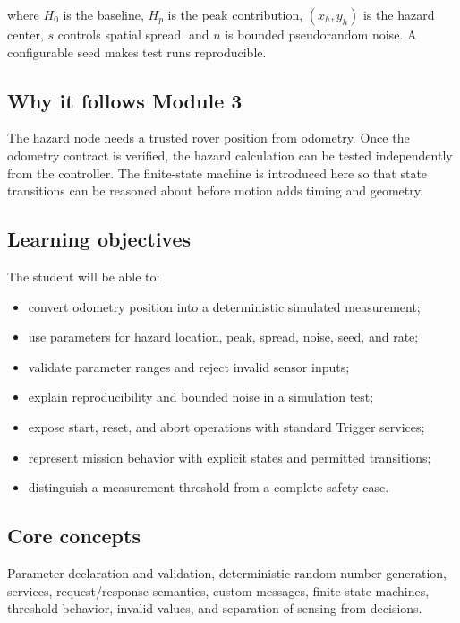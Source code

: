 \documentclass[11pt]{article}
\begin{document}
where $H_{0}$ is the baseline, $H_{p}$ is the peak contribution,
$(x_{h},y_{h})$ is the hazard center, $s$ controls spatial spread, and $n$ is
bounded pseudorandom noise. A configurable seed makes test runs reproducible.

\subsection{Why it follows Module 3}

The hazard node needs a trusted rover position from odometry. Once the odometry
contract is verified, the hazard calculation can be tested independently from
the controller. The finite-state machine is introduced here so that state
transitions can be reasoned about before motion adds timing and geometry.

\subsection{Learning objectives}

The student will be able to:

\begin{itemize}
  \item convert odometry position into a deterministic simulated measurement;
  \item use parameters for hazard location, peak, spread, noise, seed, and rate;
  \item validate parameter ranges and reject invalid sensor inputs;
  \item explain reproducibility and bounded noise in a simulation test;
  \item expose start, reset, and abort operations with standard Trigger services;
  \item represent mission behavior with explicit states and permitted
        transitions;
  \item distinguish a measurement threshold from a complete safety case.
\end{itemize}

\subsection{Core concepts}

Parameter declaration and validation, deterministic random number generation,
services, request/response semantics, custom messages, finite-state machines,
threshold behavior, invalid values, and separation of sensing from decisions.
\end{document}
